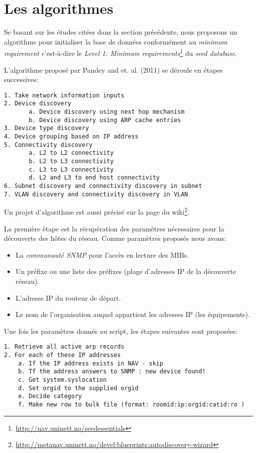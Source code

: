 \section{Les algorithmes}
Se basant sur les études citées dans la section précédente, nous proposons un algorithme pour initialiser la base de données conformément au \emph{minimum requirement} c'est-à-dire le \emph{Level 1: Minimum requirements}\footnote{\url{http://nav.uninett.no/seedessentials}} du \emph{seed database}.


L'algorithme proposé par Pandey and et. al. (2011) se déroule en étapes successives:

\begin{verbatim}
1. Take network information inputs
2. Device discovery
       a. Device discovery using next hop mechanism
       b. Device discovery using ARP cache entries
3. Device type discovery
4. Device grouping based on IP address
5. Connectivity discovery
       a. L2 to L2 connectivity
       b. L2 to L3 connectivity
       c. L3 to L3 connectivity
       d. L2 and L3 to end host connectivity
6. Subnet discovery and connectivity discovery in subnet
7. VLAN discovery and connectivity discovery in VLAN

\end{verbatim}



Un projet d'algorithme est aussi précisé sur la page du wiki\footnote{\url{http://metanav.uninett.no/devel:blueprints:autodiscovery-wizard}}.

La  première étape est la récupération des paramètres nécessaires pour la découverte des hôtes du réseau. Comme paramètres proposés nous avons:
\begin{itemize}
\item La \emph{communauté SNMP} pour l'accès en  lecture des MIBs.
\item Un préfixe ou une liste des préfixes (plage d'adresses IP de la découverte réseau).
\item L'adresse IP du routeur de départ.
\item Le nom de l'organisation auquel appartient les adresses IP (les équipements).
\end{itemize}
Une fois les paramètres donnés au script, les étapes suivantes sont proposées:


\begin{verbatim}
1. Retrieve all active arp records 
2. For each of these IP addresses
    a. If the IP address exists in NAV - skip
    b. Tf the address answers to SNMP : new device found!
    c. Get system.syslocation
    d. Set orgid to the supplied orgid
    e. Decide category
    f. Make new row to bulk file (format: roomid:ip:orgid:catid:ro )
\end{verbatim}

